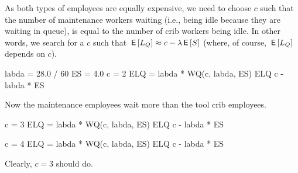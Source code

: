 \documentclass[companion]{subfiles}
\begin{document}
\begin{exercise}[Hall 5.10]
\begin{solution}
As both types of
employees are equally expensive, we need to choose $c$ such that
the number of maintenance workers waiting (i.e., being idle because they are waiting in queue), is equal to the number of crib workers being idle. In other words, we search for a $c$ such that $\,\mathsf{E}\left[L_Q\right] \approx c- \lambda \,\mathsf{E}\left[S\right]$ (where, of course, $\,\mathsf{E}\left[L_Q\right]$ depends on $c$).


\begin{pyconsole}
labda = 28.0 / 60
ES = 4.0
c = 2
ELQ = labda * WQ(c, labda, ES)
ELQ
c - labda * ES
\end{pyconsole} 
Now the maintenance employees wait more than the tool crib employees.

\begin{pyconsole}
c = 3
ELQ = labda * WQ(c, labda, ES)
ELQ
c - labda * ES
\end{pyconsole} 

\begin{pyconsole}
c = 4
ELQ = labda * WQ(c, labda, ES)
ELQ
c - labda * ES
\end{pyconsole} 

Clearly, $c=3$ should do.
\end{solution}
\end{exercise}
\end{document}
